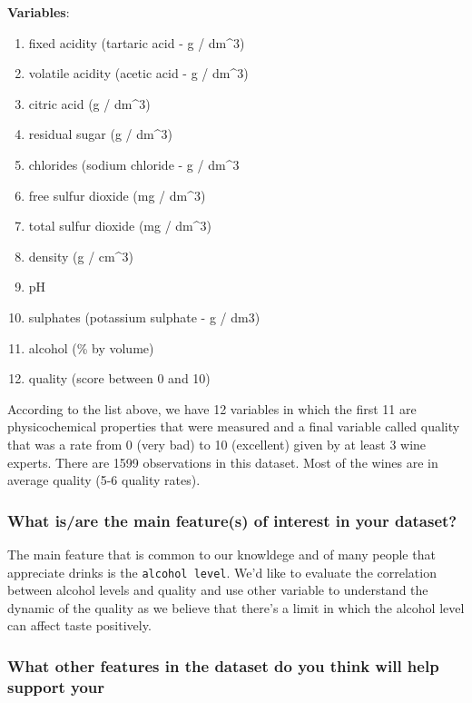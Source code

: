 \documentclass[]{article}
\providecommand{\tightlist}{%
  \setlength{\itemsep}{0pt}\setlength{\parskip}{0pt}}
\begin{document}
\textbf{Variables}:

\begin{enumerate}
\def\labelenumi{\arabic{enumi}.}
\tightlist
\item
  fixed acidity (tartaric acid - g / dm\^{}3)
\item
  volatile acidity (acetic acid - g / dm\^{}3)
\item
  citric acid (g / dm\^{}3)
\item
  residual sugar (g / dm\^{}3)
\item
  chlorides (sodium chloride - g / dm\^{}3
\item
  free sulfur dioxide (mg / dm\^{}3)
\item
  total sulfur dioxide (mg / dm\^{}3)
\item
  density (g / cm\^{}3)
\item
  pH
\item
  sulphates (potassium sulphate - g / dm3)
\item
  alcohol (\% by volume)
\item
  quality (score between 0 and 10)
\end{enumerate}

According to the list above, we have 12 variables in which the first 11
are physicochemical properties that were measured and a final variable
called quality that was a rate from 0 (very bad) to 10 (excellent) given
by at least 3 wine experts. There are 1599 observations in this dataset.
Most of the wines are in average quality (5-6 quality rates).

\hypertarget{what-isare-the-main-features-of-interest-in-your-dataset}{%
\subsubsection{What is/are the main feature(s) of interest in your
dataset?}\label{what-isare-the-main-features-of-interest-in-your-dataset}}

The main feature that is common to our knowldege and of many people that
appreciate drinks is the \texttt{alcohol\ level}. We'd like to evaluate
the correlation between alcohol levels and quality and use other
variable to understand the dynamic of the quality as we believe that
there's a limit in which the alcohol level can affect taste positively.

\hypertarget{what-other-features-in-the-dataset-do-you-think-will-help-support-your}{%
\subsubsection{\texorpdfstring{What other features in the dataset do you
think will help support your\\
}{What other features in the dataset do you think will help support your }}\label{what-other-features-in-the-dataset-do-you-think-will-help-support-your}}
\end{document}
